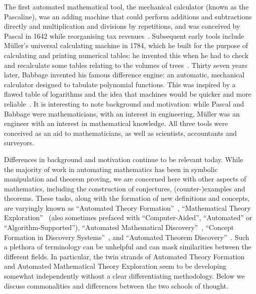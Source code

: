 The first automated mathematical tool, the mechanical calculator
(known as the Pascaline), was an adding machine that could perform
additions and subtractions directly and multiplication and divisions
by repetitions, and was conceived by Pascal in 1642 while reorganising
tax revenues~\cite{d'ocagne}. Subsequent early tools include
M\"uller's universal calculating machine in 1784, which he built for
the purpose of calculating and printing numerical tables: he invented
this when he had to check and recalculate some tables relating to the
volumes of trees~\cite[p. 65]{lindgren}. Thirty seven years later,
Babbage invented his famous difference engine: an automatic,
mechanical calculator designed to tabulate polynomial functions. This
was inspired by a flawed table of logarithms and the idea that
machines would be quicker and more reliable~\cite{bowden}. It is
interesting to note background and motivation: while Pascal and
Babbage were mathematicians, with an interest in engineering, M\"uller
was an engineer with an interest in mathematical knowledge. All three
tools were conceived as an aid to mathematicians, as well as
scientists, accountants and surveyors.

Differences in background and motivation continue to be relevant
today. While the majority of work in automating mathematics has been
in symbolic manipulation and theorem proving, we are concerned here
with other aspects of mathematics, including the construction of conjectures,
(counter\nobreakdash-)examples and theorems. These tasks, along with the
formation of new definitions and concepts, are varyingly known as
``Automated Theory Formation''~\cite{lenat:77,colton:book},
``Mathematical Theory Exploration''~\cite{buchberger:06} (also sometimes
prefaced with ``Computer-Aided'', ``Automated'' or ``Algorithm-Supported''),
``Automated Mathematical Discovery''~\cite{epstein:91,colton:interestingness,esarm2008},
``Concept Formation in Discovery Systems''~\cite{haase}, and
``Automated Theorem Discovery''~\cite{roy}. Such a plethora of terminology can
be unhelpful and can mask similarities between the different fields. In
particular, the twin strands of Automated Theory Formation and
Automated Mathematical Theory Exploration seem to be developing
somewhat independently without a clear differentiating
methodology. Below we discuss commonalities and differences between
the two schools of thought.

